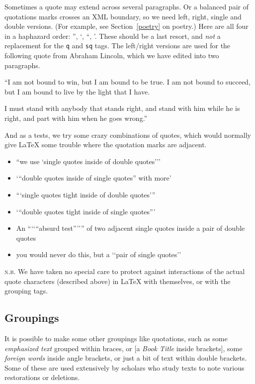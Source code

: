 \documentclass[10pt,]{article}
\newcommand{\abbreviation}[1]{\textsc{\MakeLowercase{#1}}}
\theoremstyle{plain}
\theoremstyle{definition}
\theoremstyle{definition}
\theoremstyle{definition}
\theoremstyle{definition}
\theoremstyle{definition}
\theoremstyle{definition}
\numberwithin{equation}{section}
\begin{document}
\hypertarget{p-237}{}%
Sometimes a quote may extend across several paragraphs.  Or a balanced pair of quotations marks crosses an XML boundary, so we need left, right, single and double versions.  (For example, see Section~\hyperref[poetry]{\ref{poetry}} on poetry.)  Here are all four in a haphazard order: '', `, ``, '.  These should be a last resort, and \emph{not} a replacement for the \lstinline?q? and \lstinline?sq? tags.  The left/right versions are used for the following quote from Abraham Lincoln, which we have edited into two paragraphs.%
\par
\hypertarget{p-238}{}%
``I am not bound to win, but I am bound to be true. I am not bound to succeed, but I am bound to live by the light that I have.%
\par
\hypertarget{p-239}{}%
I must stand with anybody that stands right, and stand with him while he is right, and part with him when he goes wrong.''%
\par
\hypertarget{p-240}{}%
And as a tests, we try some crazy combinations of quotes, which would normally give \LaTeX{} some trouble where the quotation marks are adjacent.\leavevmode%
\begin{itemize}[label=\textbullet]
\item{}\hypertarget{p-241}{}%
``we use `single quotes inside of double quotes{'}''%
\item{}\hypertarget{p-242}{}%
{`}``double quotes inside of single quotes'' with more'%
\item{}\hypertarget{p-243}{}%
``{`}single quotes tight inside of double quotes{'}''%
\item{}\hypertarget{p-244}{}%
{`}``double quotes tight inside of single quotes''{'}%
\item{}\hypertarget{p-245}{}%
An ``{`}{`}``absurd test''{'}{'}'' of two adjacent single quotes inside a pair of double quotes%
\item{}\hypertarget{p-246}{}%
you would never do this, but a {`}{`}pair of single quotes{'}{'}%
\end{itemize}
%
\par
\hypertarget{p-247}{}%
\abbreviation{N.B.} We have taken no special care to protect against interactions of the actual quote characters (described above) in \LaTeX{} with themselves, or with the grouping tags.%
\typeout{************************************************}
\typeout{************************************************}
\subsection[{Groupings}]{Groupings}\label{subsection-16}
\hypertarget{p-248}{}%
It is possible to make some other groupings like quotations, such as \textbraceleft{}some \emph{emphasized text} grouped within braces\textbraceright{}, or [a \textsl{Book Title} inside brackets], \textlangle{}some \textit{foreign words} inside angle brackets\textrangle{}, or \textlbrackdbl{}just a bit of text within double brackets\textrbrackdbl{}.  Some of these are used extensively by scholars who study texts to note various restorations or deletions.%
\typeout{************************************************}
\typeout{************************************************}
\end{document}
